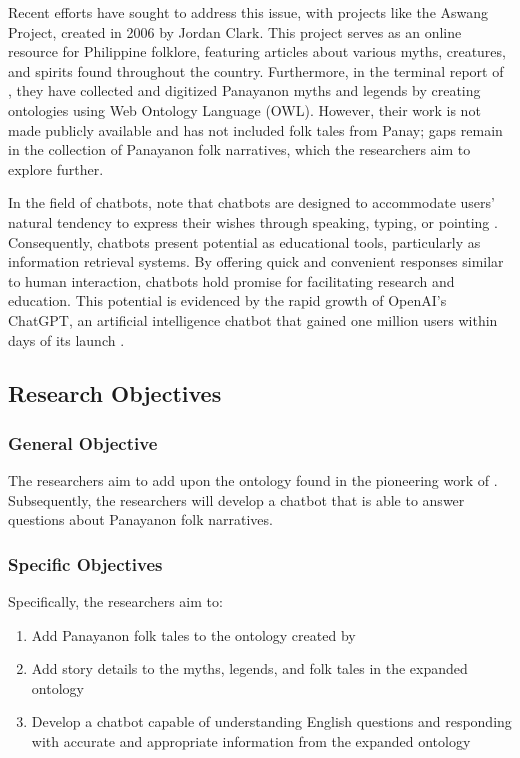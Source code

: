 Recent efforts have sought to address this issue, with projects like the Aswang Project, created in 2006 by Jordan Clark. This project serves as an online resource for Philippine folklore, featuring articles about various myths, creatures, and spirits found throughout the country. Furthermore, in the terminal report of , they have collected and digitized Panayanon myths and legends by creating ontologies using Web Ontology Language (OWL). However, their work is not made publicly available and has not included folk tales from Panay; gaps remain in the collection of Panayanon folk narratives, which the researchers aim to explore further.

In the field of chatbots,  note that chatbots are designed to accommodate users' natural tendency to express their wishes through speaking, typing, or pointing \cite{zadrozny2000natural}. Consequently, chatbots present potential as educational tools, particularly as information retrieval systems. By offering quick and convenient responses similar to human interaction, chatbots hold promise for facilitating research and education. This potential is evidenced by the rapid growth of OpenAI’s ChatGPT, an artificial intelligence chatbot that gained one million users within days of its launch \cite{Mortensen_2024}.



\subsection{Research Objectives}
\label{subsecsec:researchobjectives}

\subsubsection{General Objective}
\label{subsec:generalobjective}

The researchers aim to add upon the ontology found in the pioneering work of . Subsequently, the researchers will develop a chatbot that is able to answer questions about Panayanon folk narratives. 

\subsubsection{Specific Objectives}
\label{subsec:specificobjectives}
Specifically, the researchers aim to:
\begin{enumerate}
    \item Add Panayanon folk tales to the ontology created by 
    \item Add story details to the myths, legends, and folk tales in the expanded ontology
    \item Develop a chatbot capable of understanding English questions and responding with accurate and appropriate information from the expanded ontology

\end{enumerate}



